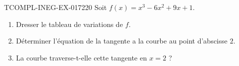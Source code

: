 \begin{exercice}{TCOMPL-INEG-EX-017}{2}{20}
Soit $f(x) = x^3 - 6x^2 + 9x + 1$.
\begin{enumerate}
  \item Dresser le tableau de variations de $f$.
  \item Déterminer l'équation de la tangente a la courbe au point d'abscisse $2$.
  \item La courbe traverse-t-elle cette tangente en $x = 2$ ?
\end{enumerate}

\end{exercice}
